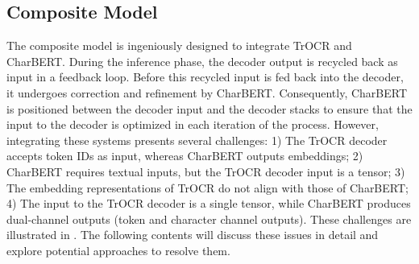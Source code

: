 \subsection{Composite Model}
\label{subsec:3_composite_model}
The composite model is ingeniously designed to integrate TrOCR and CharBERT. During the inference phase, the decoder output is recycled back as input in a feedback loop. Before this recycled input is fed back into the decoder, it undergoes correction and refinement by CharBERT. Consequently, CharBERT is positioned between the decoder input and the decoder stacks to ensure that the input to the decoder is optimized in each iteration of the process. However, integrating these systems presents several challenges: 1) The TrOCR decoder accepts token IDs as input, whereas CharBERT outputs embeddings; 2) CharBERT requires textual inputs, but the TrOCR decoder input is a tensor; 3) The embedding representations of TrOCR do not align with those of CharBERT; 4) The input to the TrOCR decoder is a single tensor, while CharBERT produces dual-channel outputs (token and character channel outputs). These challenges are illustrated in . The following contents will discuss these issues in detail and explore potential approaches to resolve them.


